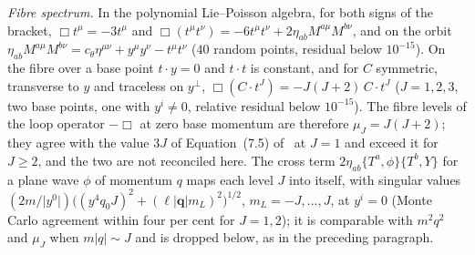 \emph{Fibre spectrum.} In the polynomial Lie--Poisson algebra, for both signs of the bracket, \(\Box t^\mu=-3t^\mu\) and \(\Box(t^\mu t^\nu)=-6t^\mu t^\nu+2\eta_{ab}M^{a\mu}M^{b\nu}\), and on the orbit \(\eta_{ab}M^{a\mu}M^{b\nu}=c_\theta\eta^{\mu\nu}+y^\mu y^\nu-t^\mu t^\nu\) (\(40\) random points, residual below \(10^{-15}\)). On the fibre over a base point \(t\cdot y=0\) and \(t\cdot t\) is constant, and for \(C\) symmetric, transverse to \(y\) and traceless on \(y^\perp\), \(\Box(C\cdot t^J)=-J(J+2)\,C\cdot t^J\) (\(J=1,2,3\), two base points, one with \(y^i\neq0\), relative residual below \(10^{-15}\)). The fibre levels of the loop operator \(-\Box\) at zero base momentum are therefore \(\mu_J=J(J+2)\); they agree with the value \(3J\) of Equation~(7.5) of~\cite{Steinacker2023} at \(J=1\) and exceed it for \(J\ge2\), and the two are not reconciled here. The cross term \(2\eta_{ab}\{T^a,\phi\}\{T^b,Y\}\) for a plane wave \(\phi\) of momentum \(q\) maps each level \(J\) into itself, with singular values \((2m/\lvert y^0\rvert)\bigl((y^4q_0J)^2+(\ell\lvert\mathbf q\rvert m_L)^2\bigr)^{1/2}\), \(m_L=-J,\dots,J\), at \(y^i=0\) (Monte Carlo agreement within four per cent for \(J=1,2\)); it is comparable with \(m^2q^2\) and \(\mu_J\) when \(m\lvert q\rvert\sim J\) and is dropped below, as in the preceding paragraph.


